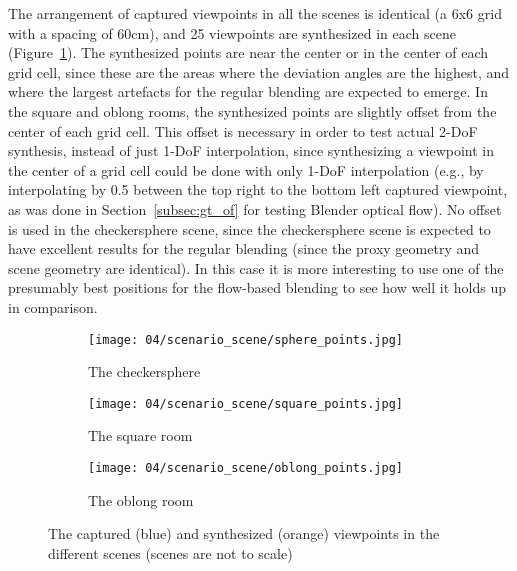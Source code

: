 The arrangement of captured viewpoints in all the scenes is identical (a 6x6 grid with a spacing of 60cm), and 25 viewpoints are synthesized in each scene (Figure~\ref{fig:scene_setup}). The synthesized points are near the center or in the center of each grid cell, since these are the areas where the deviation angles are the highest, and where the largest artefacts for the regular blending are expected to emerge. In the square and oblong rooms, the synthesized points are slightly offset from the center of each grid cell.
This offset is necessary in order to test actual 2-DoF synthesis, instead of just 1-DoF interpolation, since synthesizing a viewpoint in the center of a grid cell could be done with only 1-DoF interpolation (e.g., by interpolating by 0.5 between the top right to the bottom left captured viewpoint, as was done in Section~\ref{subsec:gt_of} for testing Blender optical flow). No offset is used in the checkersphere scene, since the checkersphere scene is expected to have excellent results for the regular blending (since the proxy geometry and scene geometry are identical). In this case it is more interesting to use one of the presumably best positions for the flow-based blending to see how well it holds up in comparison.

\begin{figure}
\centering
    \hfill
    \begin{subfigure}[b]{0.4\textwidth}
            \centering
            \texttt{[image: 04/scenario\_scene/sphere\_points.jpg]}
            \caption{The checkersphere}
    \end{subfigure}%
    \hfill
    \begin{subfigure}[b]{0.4\textwidth}
            \centering
            \texttt{[image: 04/scenario\_scene/square\_points.jpg]}
            \caption{The square room}
    \end{subfigure}
    \hfill
    \hfill

    \hfill
    \begin{subfigure}[b]{0.4\textwidth}
            \centering
            \texttt{[image: 04/scenario\_scene/oblong\_points.jpg]}
            \caption{The oblong room}
    \end{subfigure}%
    \hfill
    \hfill
  \caption[The captured and synthesized viewpoints in the different scenes]{The captured (blue) and synthesized (orange) viewpoints in the different scenes (scenes are not to scale)} \label{fig:scene_setup}
\end{figure}


